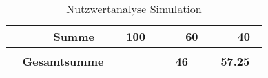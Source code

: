 \documentclass[main.tex]{subfiles} %
\begin{document}
\begin{table}[ht]
\begin{tabular}{|p{0.14\linewidth}|p{0.15\linewidth}|p{0.115\linewidth}|p{0.08\linewidth}|p{0.09\linewidth}|p{0.08\linewidth}|p{0.09\linewidth}|}
        & \textbf{Summe} & \textbf{100} &  & \textbf{60} &  & \textbf{40} \\[1pt]
        \hline
        \hline
        \multicolumn{2}{|c|}{} &&\multicolumn{2}{c|}{}&\multicolumn{2}{c|}{} \\[-9pt]
        \multicolumn{2}{|c|}{\textbf{Gesamtsumme}} &  & \multicolumn{2}{c|}{\textbf{46}} & \multicolumn{2}{c|}{\textbf{57.25}} \\[1pt]
        \hline
        \end{tabular}
    \caption{Nutzwertanalyse Simulation}
\end{table}
\end{document}
